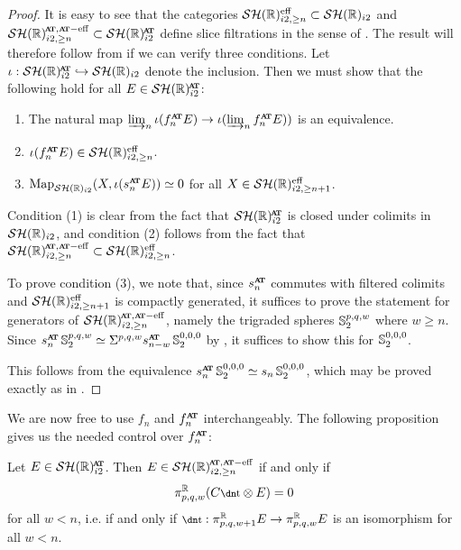 \begin{proof}
  It is easy to see that the categories $\mathcal{SH}(\mathbb{R})^{\mathrm{eff}} _{i2, \geq n} \subset \mathcal{SH}(\mathbb{R})_{i2}$ and $\SHR^{\at, \gceff} _{i2, \geq n} \subset \SHRat$ define slice filtrations in the sense of \cite[Definition 2.1]{SliceComp}.
  The result will therefore follow from \cite[Theorem 2.20]{SliceComp} if we can verify three conditions. Let $\iota : \SHRat \hookrightarrow \SHR_{i2}$ denote the inclusion. Then we must show that the following hold for all $E \in \SHRat$:
  \begin{enumerate}
    \item The natural map $\varinjlim_{n} \iota(f_n ^{\att} E) \to \iota(\varinjlim_{n} f_n ^{\att} E))$ is an equivalence.
    \item $\iota(f_n ^{\att} E) \in \SHR^{\eff} _{i2, \geq n}$.
    \item $\Map_{\SHR_{i2} } (X, \iota(s_n ^{\att} E)) \simeq 0$ for all $X \in \mathcal{SH}(\mathbb{R})^{\mathrm{eff}} _{i2, \geq n+1}$.
  \end{enumerate}
  Condition (1) is clear from the fact that $\SHRat$ is closed under colimits in $\mathcal{SH}(\mathbb{R})_{i2}$, and condition (2) follows from the fact that $\SHR^{\at, \gceff} _{i2, \geq n} \subset \SHR^{\eff} _{i2, \geq n}$.

  To prove condition (3), we note that, since $s_n ^{\att}$ commutes with filtered colimits and $\mathcal{SH}(\mathbb{R})^{\mathrm{eff}} _{i2, \geq n+1}$ is compactly generated, it suffices to prove the statement for generators of $\SHR^{\at, \gceff} _{i2, \geq n}$, namely the trigraded spheres $\operatorname{\mathbb{S}}_2 ^{p,q,w}$ where $w \geq n$.
  Since $s_n ^{\att} \Ss_2^{p,q,w} \simeq \Sigma^{p,q,w} s_{n-w} ^{\att} \Ss_2^{0,0,0}$ by , it suffices to show this for $\operatorname{\mathbb{S}}_2^{0,0,0}$.

  This follows from the equivalence $s_{n} ^{\att} \Ss_2 ^{0,0,0} \simeq s_{n} \Ss_2^{0,0,0}$, which may be proved exactly as in \cite[Theorem 3.15]{SliceComp}.
\end{proof}

We are now free to use $f_n$ and $f^{\att} _n$ interchangeably. The following proposition gives us the needed control over $f^{\att} _n$:

\begin{prop} \label{prop:eff-condition}
  Let $E \in \SHRat$. Then $E \in \SHR^{\at, \gceff} _{i2, \geq n}$ if and only if
  \[ \pi^{\R} _{p,q,w} (C\ta \otimes E) = 0 \]
  for all $w < n$, i.e. if and only if $\ta : \pi^{\R} _{p,q,w+1} E \to \pi^{\R} _{p,q,w} E$ is an isomorphism for all $w < n$.
\end{prop}

